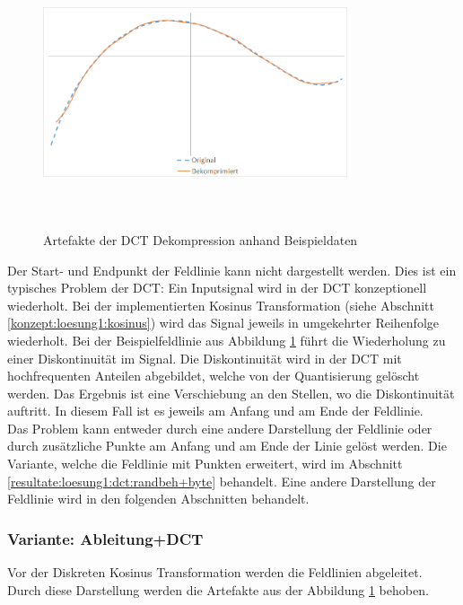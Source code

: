 \begin{figure}[!htbp]
	\center
	\includegraphics[width=0.8\textwidth,height=8cm,keepaspectratio]{./pictures/resultate/loesung1/loesung1-0/loesung1_0_artefakte.png}
	\caption{Artefakte der DCT Dekompression anhand Beispieldaten}
	\label{resultate:loesung1:dct:artefakte}
\end{figure}
Der Start- und Endpunkt der Feldlinie kann nicht dargestellt werden. Dies ist ein typisches Problem der DCT: Ein Inputsignal wird in der DCT konzeptionell wiederholt. Bei der implementierten Kosinus Transformation (siehe Abschnitt \ref{konzept:loesung1:kosinus}) wird das Signal jeweils in umgekehrter Reihenfolge wiederholt. Bei der Beispielfeldlinie aus Abbildung \ref{resultate:loesung1:dct:artefakte} führt die Wiederholung zu einer Diskontinuität im Signal. Die Diskontinuität wird in der DCT mit hochfrequenten Anteilen abgebildet, welche von der Quantisierung gelöscht werden. Das Ergebnis ist eine Verschiebung an den Stellen, wo die Diskontinuität auftritt. In diesem Fall ist es jeweils am Anfang und am Ende der Feldlinie.\\
Das Problem kann entweder durch eine andere Darstellung der Feldlinie oder durch zusätzliche Punkte am Anfang und am Ende der Linie gelöst werden. Die Variante, welche die Feldlinie mit Punkten erweitert, wird im Abschnitt \ref{resultate:loesung1:dct:randbeh+byte} behandelt. Eine andere Darstellung der Feldlinie wird in den folgenden Abschnitten behandelt.

\subsubsection{Variante: Ableitung+DCT}\label{resultate:dct:ableitung_dct}
Vor der Diskreten Kosinus Transformation werden die Feldlinien abgeleitet. Durch diese Darstellung werden die Artefakte aus der Abbildung \ref{resultate:loesung1:dct:artefakte} behoben.

